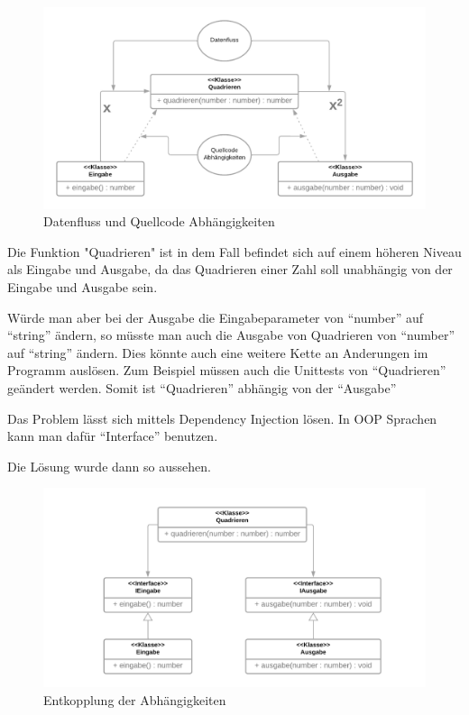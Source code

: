 \documentclass{article}
\begin{document}
    \begin{figure}[H]
        \centering
        \includegraphics[width=1\textwidth]{./images/DepInj_1.png}
        \caption{Datenfluss und Quellcode Abhängigkeiten}
        \label{fig:flow around cylinder}
    \end{figure}

    Die Funktion "Quadrieren" ist in dem Fall befindet sich auf einem höheren Niveau als Eingabe und Ausgabe, 
    da das Quadrieren einer Zahl soll unabhängig von der Eingabe und Ausgabe sein.

    Würde man aber bei der Ausgabe die Eingabeparameter von ``number'' auf ``string'' ändern, so müsste man auch die Ausgabe von Quadrieren von ``number'' auf ``string'' ändern.
    Dies könnte auch eine weitere Kette an Anderungen im Programm auslösen. Zum Beispiel müssen auch die Unittests von ``Quadrieren'' geändert werden.
    Somit ist ``Quadrieren'' abhängig von der ``Ausgabe''

    Das Problem lässt sich mittels Dependency Injection lösen.
    In OOP Sprachen kann man dafür ``Interface'' benutzen.

    Die Lösung wurde dann so aussehen. 
    \begin{figure}[H]
        \centering
        \includegraphics[width=1\textwidth]{./images/DepInj_2.png}
        \caption{Entkopplung der Abhängigkeiten}
        \label{fig:flow around cylinder}
    \end{figure}
\end{document}
